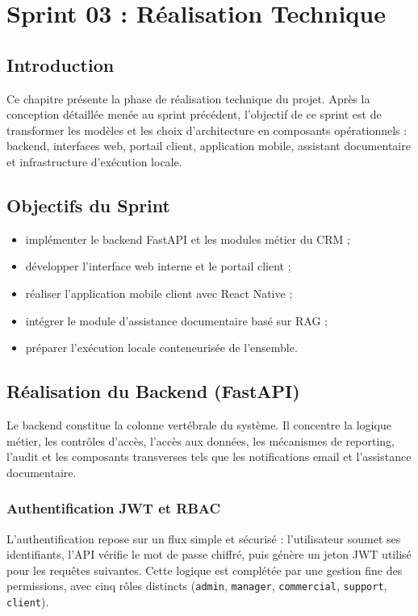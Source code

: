 \chapter{Sprint 03 : Réalisation Technique}
\minitoc
\newpage

\section{Introduction}
Ce chapitre présente la phase de réalisation technique du projet. Après la conception détaillée menée au sprint précédent, l'objectif de ce sprint est de transformer les modèles et les choix d'architecture en composants opérationnels : backend, interfaces web, portail client, application mobile, assistant documentaire et infrastructure d'exécution locale.

\section{Objectifs du Sprint}
\begin{itemize}
    \item implémenter le backend FastAPI et les modules métier du CRM ;
    \item développer l'interface web interne et le portail client ;
    \item réaliser l'application mobile client avec React Native ;
    \item intégrer le module d'assistance documentaire basé sur RAG ;
    \item préparer l'exécution locale conteneurisée de l'ensemble.
\end{itemize}

\section{Réalisation du Backend (FastAPI)}
Le backend constitue la colonne vertébrale du système. Il concentre la logique métier, les contrôles d'accès, l'accès aux données, les mécanismes de reporting, l'audit et les composants transverses tels que les notifications email et l'assistance documentaire.

\subsection{Authentification JWT et RBAC}
L'authentification repose sur un flux simple et sécurisé : l'utilisateur soumet ses identifiants, l'API vérifie le mot de passe chiffré, puis génère un jeton JWT utilisé pour les requêtes suivantes. Cette logique est complétée par une gestion fine des permissions, avec cinq rôles distincts (\texttt{admin}, \texttt{manager}, \texttt{commercial}, \texttt{support}, \texttt{client}).\par
\vspace{0.3cm}

